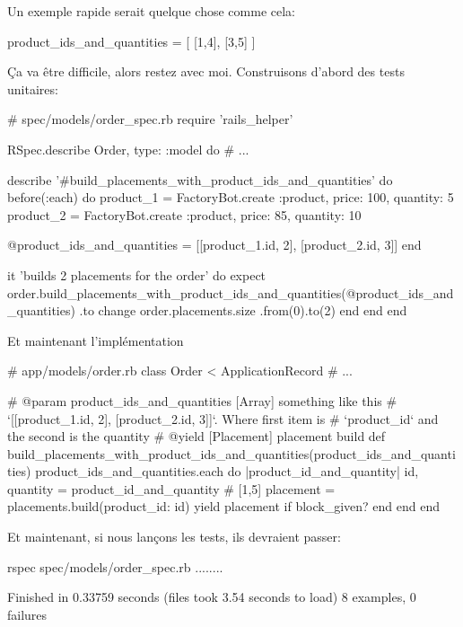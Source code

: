 \documentclass[]{report}
\begin{document}
    Un exemple rapide serait quelque chose comme cela:

    \begin{rubycode}
    product_ids_and_quantities = [
      [1,4],
      [3,5]
    ]
    \end{rubycode}

    Ça va être difficile, alors restez avec moi. Construisons d'abord des tests unitaires:

    \begin{rubycode}
    # spec/models/order_spec.rb
    require 'rails_helper'

    RSpec.describe Order, type: :model do
      # ...

      describe '#build_placements_with_product_ids_and_quantities' do
        before(:each) do
          product_1 = FactoryBot.create :product, price: 100, quantity: 5
          product_2 = FactoryBot.create :product, price: 85, quantity: 10

          @product_ids_and_quantities = [[product_1.id, 2], [product_2.id, 3]]
        end

        it 'builds 2 placements for the order' do
          expect { order.build_placements_with_product_ids_and_quantities(@product_ids_and_quantities) }.to change { order.placements.size }.from(0).to(2)
        end
      end
    end
    \end{rubycode}

    Et maintenant l'implémentation

    \begin{rubycode}
    # app/models/order.rb
    class Order < ApplicationRecord
      # ...

      # @param product_ids_and_quantities [Array] something like this
      #        `[[product_1.id, 2], [product_2.id, 3]]`. Where first item is
      #        `product_id` and the second is the quantity
      # @yield [Placement] placement build
      def build_placements_with_product_ids_and_quantities(product_ids_and_quantities)
        product_ids_and_quantities.each do |product_id_and_quantity|
          id, quantity = product_id_and_quantity # [1,5]
          placement = placements.build(product_id: id)
          yield placement if block_given?
        end
      end
    end
    \end{rubycode}

    Et maintenant, si nous lançons les tests, ils devraient passer:

    \begin{bashcode}
    rspec spec/models/order_spec.rb
    ........

    Finished in 0.33759 seconds (files took 3.54 seconds to load)
    8 examples, 0 failures
    \end{bashcode}
\end{document}
